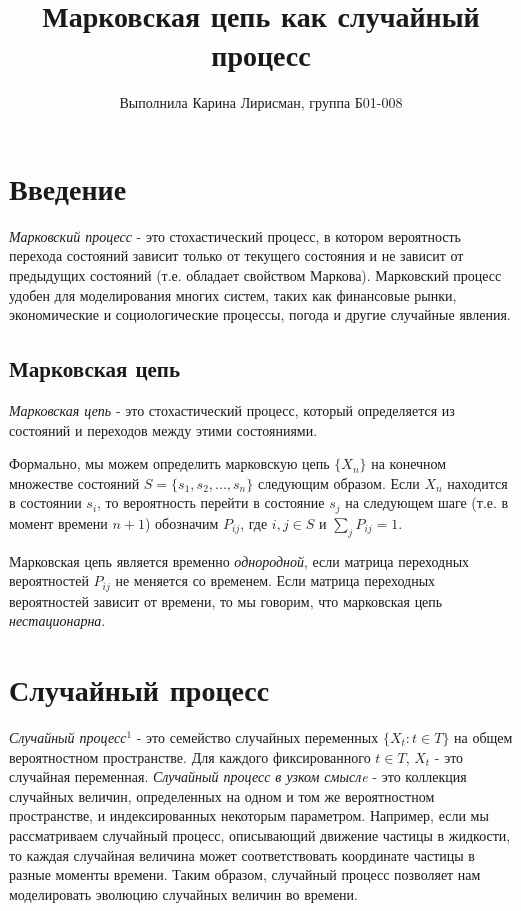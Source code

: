 \documentclass[12pt]{article}
\begin{document}
\title{\textbf{Марковская цепь как случайный процесс}}
\author{Выполнила Карина Лирисман, группа Б01-008}
\date{}

\maketitle

\section{Введение}

\textit{Марковский процесс} - это стохастический процесс, в котором вероятность перехода состояний зависит только от текущего состояния и не зависит от предыдущих состояний (т.е. обладает свойством Маркова). Марковский процесс удобен для моделирования многих систем, таких как финансовые рынки, экономические и социологические процессы, погода и другие случайные явления.

\subsection{Марковская цепь}

\textit{Марковская цепь} - это стохастический процесс, который определяется из состояний и переходов между этими состояниями. 

Формально, мы можем определить марковскую цепь $\{X_n\}$ на конечном множестве состояний $S = \{s_1, s_2, ..., s_n\}$ следующим образом. Если $X_n$ находится в состоянии $s_i$, то вероятность перейти в состояние $s_j$ на следующем шаге (т.е. в момент времени $n+1$) обозначим $P_{ij}$, где $i,j \in S$ и $\sum_{j}P_{ij}=1$.

Марковская цепь является временно \textit{однородной}, если матрица переходных вероятностей $P_{ij}$ не меняется со временем. Если матрица переходных вероятностей зависит от времени, то мы говорим, что марковская цепь \textit{нестационарна}.

\section{Случайный процесс}

\textit{Случайный процесс$^1$} - это семейство случайных переменных $\{X_t : t \in T\}$ на общем вероятностном пространстве. Для каждого фиксированного $t \in T$, $X_t$ - это случайная переменная. \textit{Случайный процесс в узком смыслe} - это коллекция случайных величин, определенных на одном и том же вероятностном пространстве, и индексированных некоторым параметром. Например, если мы рассматриваем случайный процесс, описывающий движение частицы в жидкости, то каждая случайная величина может соответствовать координате частицы в разные моменты времени. Таким образом, случайный процесс позволяет нам моделировать эволюцию случайных величин во времени.
\end{document}

